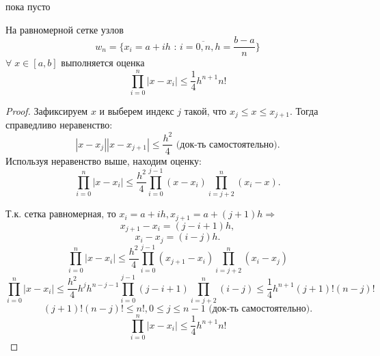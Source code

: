\begin{col-answer-preambule}
	\begin{plan}
    \item пока пусто
	\end{plan}
\end{col-answer-preambule}


\begin{lemma}
  На равномерной сетке узлов
  \begin{equation*}
    w_n = \{ x_i = a + ih \text{ : } i = \overline{0, n}, h = \dfrac{b - a}{n} \}
  \end{equation*}
  $\forall \; x \in [a, b]$ выполняется оценка
  \begin{equation*}
    \prod\limits_{i = 0}^{n} \left| x - x_i \right| \leqslant \dfrac{1}{4} h ^{n + 1} n!
  \end{equation*}
\end{lemma}
\begin{proof}
  Зафиксируем $x$ и выберем индекс $j$ такой, что $x_j \leqslant x \leqslant x_{j + 1}$. Тогда справедливо неравенство:
  \begin{equation*}
    \left|x - x_j \right| \left| x - x_{j + 1} \right| \leqslant \dfrac{h^2}{4} \text{ (док-ть самостоятельно)}.
  \end{equation*}
  Используя неравенство выше, находим оценку:
  \begin{equation*}
    \prod\limits_{i = 0}^{n} \left| x - x_i \right| \leqslant \dfrac{h^2}{4} \prod\limits_{i = 0}^{j-1} (x - x_i) \prod_{i = j + 2}^{n} (x_i - x).
  \end{equation*}

  Т.к. сетка равномерная, то $x_i = a + ih, x_{j+1} = a + (j+1)h \Rightarrow$
  \begin{equation*}
    x_{j + 1} - x_{i} = (j - i + 1) h, 
  \end{equation*}
  \begin{equation*}
    x_i - x_j = (i - j) h.
  \end{equation*}
  \begin{equation*}
    \prod\limits_{i = 0}^n \left| x - x_i \right| \leqslant \dfrac{h^2}{4} \prod\limits_{i = 0}^{j-1} (x_{j + 1} - x_i) \prod_{i = j + 2}^{n} (x_i - x_j)
  \end{equation*}
  \begin{equation*}
    \prod\limits_{i = 0}^n \left| x - x_i \right| \leqslant \dfrac{h^2}{4} h^j h^{n - j - 1} \prod\limits_{i = 0}^{j-1} (j - i + 1) \prod_{i = j + 2}^{n} (i - j) \leqslant \dfrac{1}{4} h^{n + 1} (j+1)! (n-j)!
  \end{equation*}
  \begin{equation*}
    (j + 1)! (n - j)! \leqslant n!, 0 \leqslant j \leqslant n - 1  \text{ (док-ть самостоятельно)}.
  \end{equation*}
  \begin{equation*}
    \prod\limits_{i = 0}^n \left| x - x_i \right| \leqslant \dfrac{1}{4} h ^{n + 1} n!
  \end{equation*}
\end{proof}

